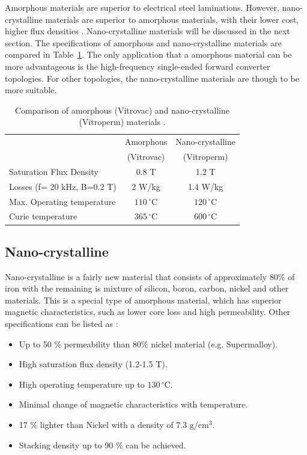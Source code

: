 \documentclass[a4paper, 11pt]{article} %
\begin{document}
Amorphous materials are superior to electrical steel laminations. However, nano-crystalline materials are superior to amorphous materials, with their lower cost, higher flux densities \cite{vitroperm_vitrovac}. Nano-crystalline materials will be discussed in the next section. The specifications of amorphous and nano-crystalline materials are compared in Table~\ref{vitropermvitrovac}. The only  application that a amorphous material can be more advantageous is the  high-frequency single-ended forward converter topologies. For other topologies, the nano-crystalline materials are though to be more suitable.

\begin{table}[]
\begin{center}
\begin{tabular}{lcc}
 & Amorphous & Nano-crystalline \\ 
 & (Vitrovac) & (Vitroperm) \\
\hline
Saturation Flux Density & 0.8 T & 1.2 T \\
Losses (f= 20 kHz, B=0.2 T) & 2 W/kg & 1.4 W/kg \\
Max. Operating temperature & $110\,^{\circ}\mathrm{C}$ & $120\,^{\circ}\mathrm{C}$ \\
Curie temperature & $365\,^{\circ}\mathrm{C}$ & $600\,^{\circ}\mathrm{C}$ \\
\hline
\end{tabular} 
\end{center}
\caption{Comparison of amorphous (Vitrovac) and nano-crystalline (Vitroperm) materials \cite{vitroperm_vitrovac}.}
\label{vitropermvitrovac}
\end{table}

\subsection*{Nano-crystalline}

Nano-crystalline is a fairly new material that consists of approximately 80\% of iron with the remaining is mixture of silicon, boron, carbon, nickel and other materials. This is a special type of amorphous material, which has superior magnetic characteristics, such as lower core loss and high permeability. Other specifications can be listed as \cite{Magnetics}:

\begin{itemize}
  \item Up to 50 \% permeability than 80\% nickel material (e.g. Supermalloy).
  \item High saturation flux density (1.2-1.5 T).
  \item High operating temperature up to $130\,^{\circ}\mathrm{C}$.
  \item Minimal change of magnetic characteristics with temperature.
  \item 17 \% lighter than Nickel with a density of 7.3 $\mathrm{g/cm^3}$.
  \item Stacking density up to 90 \% can be achieved.
\end{itemize}
\end{document}
